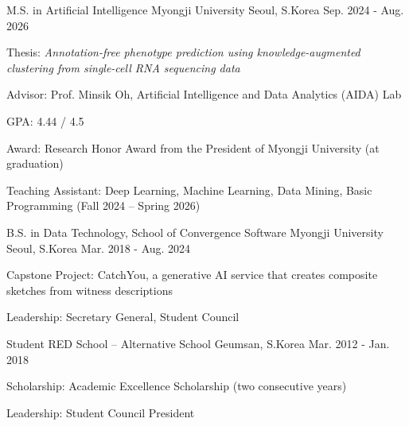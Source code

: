 \documentclass[11pt, a4paper]{awesome-cv}
\let\origcvsection\cvsection
\renewcommand{\cvsection}[1]{\needspace{7\baselineskip}\origcvsection{#1}}
\begin{document}
\begin{cventries}
\cventry
    {M.S. in Artificial Intelligence}
    {Myongji University}
    {Seoul, S.Korea}
    {Sep. 2024 - Aug. 2026}
    {
      \begin{cvitems}
        \item {Thesis: \textit{Annotation-free phenotype prediction using knowledge-augmented clustering from single-cell RNA sequencing data}}
        \item {Advisor: Prof. Minsik Oh, Artificial Intelligence and Data Analytics (AIDA) Lab}
        \item {GPA: 4.44 / 4.5}
        \item {Award: Research Honor Award from the President of Myongji University (at graduation)}
        \item {Teaching Assistant: Deep Learning, Machine Learning, Data Mining, Basic Programming (Fall 2024 -- Spring 2026)}
      \end{cvitems}
    }
\vspace{-1mm}
\cventry
    {B.S. in Data Technology, School of Convergence Software}
    {Myongji University}
    {Seoul, S.Korea}
    {Mar. 2018 - Aug. 2024}
    {
      \begin{cvitems}
        \item {Capstone Project: CatchYou, a generative AI service that creates composite sketches from witness descriptions}
        \item {Leadership: Secretary General, Student Council}
      \end{cvitems}
    }
\vspace{-1mm}
\cventry
    {Student}
    {RED School -- Alternative School}
    {Geumsan, S.Korea}
    {Mar. 2012 - Jan. 2018}
    {
      \begin{cvitems}
        \item {Scholarship: Academic Excellence Scholarship (two consecutive years)}
        \item {Leadership: Student Council President}
      \end{cvitems}
    }
\end{cventries}

\vspace{-3.5mm}
\end{document}
